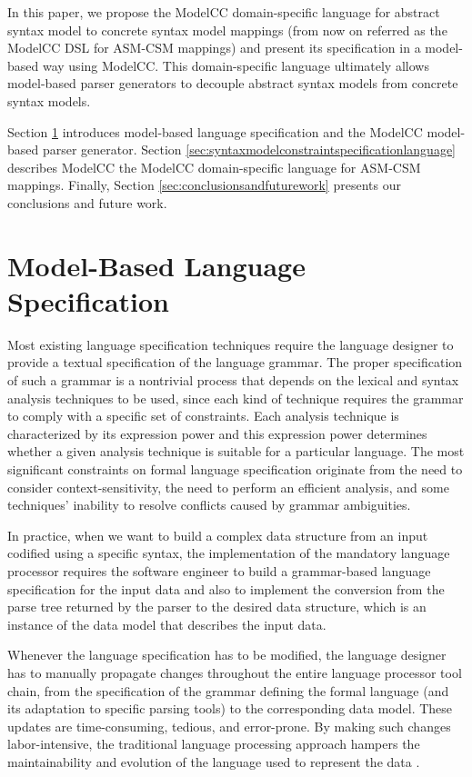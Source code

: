 \documentclass[floatfix,rmp,twocolumn,twoside]{revtex4}
\begin{document}
In this paper, we propose the ModelCC domain-specific language for abstract syntax model to concrete syntax model mappings (from now on referred as the ModelCC DSL for ASM-CSM mappings) and present its specification in a model-based way using ModelCC.
This domain-specific language ultimately allows model-based parser generators to decouple abstract syntax models from concrete syntax models.

Section \ref{sec:background} introduces model-based language specification and the ModelCC model-based parser generator.
Section \ref{sec:syntaxmodelconstraintspecificationlanguage} describes ModelCC the ModelCC domain-specific language for ASM-CSM mappings.
Finally, Section \ref{sec:conclusionsandfuturework} presents our conclusions and future work.

\section{Model-Based Language Specification} \label{sec:background}

\noindent Most existing language specification techniques \cite{Aho2006} require the language designer to provide a textual specification of the language grammar. The proper specification of such a grammar is a nontrivial process that depends on the lexical and syntax analysis techniques to be used, since each kind of technique requires the grammar to comply with a specific set of constraints. Each analysis technique is characterized by its expression power and this expression power determines whether a given analysis technique is suitable for a particular language. The most significant constraints on formal language specification originate from the need to consider context-sensitivity, the need to perform an efficient analysis, and some techniques' inability to resolve conflicts caused by grammar ambiguities.

In practice, when we want to build a complex data structure from an input codified using a specific syntax, the implementation of the mandatory language processor requires the software engineer to build a grammar-based language specification for the input data and also to implement the conversion from the parse tree returned by the parser to the desired data structure, which is an instance of the data model that describes the input data.

Whenever the language specification has to be modified, the language designer has to manually propagate changes throughout the entire language processor tool chain, from the specification of the grammar defining the formal language (and its adaptation to specific parsing tools) to the corresponding data model. These updates are time-consuming, tedious, and error-prone. By making such changes labor-intensive, the traditional language processing approach hampers the maintainability and evolution of the language used to represent the data \cite{Kats2010}.
\end{document}
